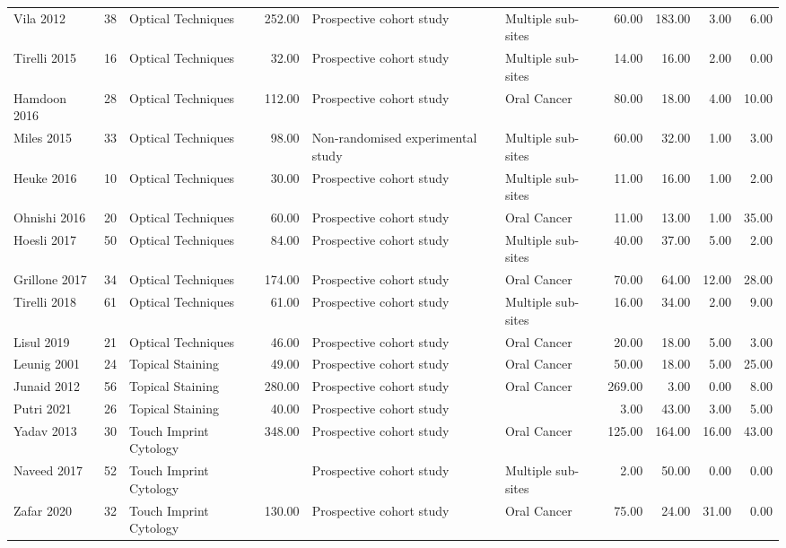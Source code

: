 \begin{table}[ht]
\begin{tabular}{lllrllrrrr}
  Vila 2012 & 38 & Optical Techniques & 252.00 & Prospective cohort study & Multiple sub-sites & 60.00 & 183.00 & 3.00 & 6.00 \\ 
  Tirelli 2015 & 16 & Optical Techniques & 32.00 & Prospective cohort study & Multiple sub-sites & 14.00 & 16.00 & 2.00 & 0.00 \\ 
  Hamdoon 2016 & 28 & Optical Techniques & 112.00 & Prospective cohort study & Oral Cancer & 80.00 & 18.00 & 4.00 & 10.00 \\ 
  Miles 2015 & 33 & Optical Techniques & 98.00 & Non-randomised experimental study & Multiple sub-sites & 60.00 & 32.00 & 1.00 & 3.00 \\ 
  Heuke 2016 & 10 & Optical Techniques & 30.00 & Prospective cohort study & Multiple sub-sites & 11.00 & 16.00 & 1.00 & 2.00 \\ 
  Ohnishi 2016 & 20 & Optical Techniques & 60.00 & Prospective cohort study & Oral Cancer & 11.00 & 13.00 & 1.00 & 35.00 \\ 
  Hoesli 2017 & 50 & Optical Techniques & 84.00 & Prospective cohort study & Multiple sub-sites & 40.00 & 37.00 & 5.00 & 2.00 \\ 
  Grillone 2017 & 34 & Optical Techniques & 174.00 & Prospective cohort study & Oral Cancer & 70.00 & 64.00 & 12.00 & 28.00 \\ 
  Tirelli 2018 & 61 & Optical Techniques & 61.00 & Prospective cohort study & Multiple sub-sites & 16.00 & 34.00 & 2.00 & 9.00 \\ 
  Lisul 2019 & 21 & Optical Techniques & 46.00 & Prospective cohort study & Oral Cancer & 20.00 & 18.00 & 5.00 & 3.00 \\ 
  Leunig 2001 & 24 & Topical Staining & 49.00 & Prospective cohort study & Oral Cancer & 50.00 & 18.00 & 5.00 & 25.00 \\ 
  Junaid 2012 & 56 & Topical Staining & 280.00 & Prospective cohort study & Oral Cancer & 269.00 & 3.00 & 0.00 & 8.00 \\ 
  Putri 2021 & 26 & Topical Staining & 40.00 & Prospective cohort study &  & 3.00 & 43.00 & 3.00 & 5.00 \\ 
  Yadav 2013 & 30 & Touch Imprint Cytology & 348.00 & Prospective cohort study & Oral Cancer & 125.00 & 164.00 & 16.00 & 43.00 \\ 
  Naveed 2017 & 52 & Touch Imprint Cytology &  & Prospective cohort study & Multiple sub-sites & 2.00 & 50.00 & 0.00 & 0.00 \\ 
  Zafar 2020 & 32 & Touch Imprint Cytology & 130.00 & Prospective cohort study & Oral Cancer & 75.00 & 24.00 & 31.00 & 0.00 \\ 

\end{tabular}
\end{table}
